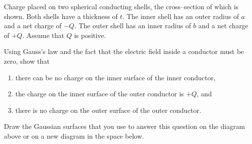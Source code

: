 \documentclass{article}
\begin{document}
Charge placed on two spherical conducting shells, the cross--section of which is shown. Both shells have a thickness of $t$. The inner shell has an outer radius of $a$ and a net charge of $-Q$. The outer shell has an inner radius of $b$ and a net charge of $+Q$. Assume that $Q$ is positive.



Using Gauss's law and the fact that the electric field inside a conductor must be zero, show that

\begin{enumerate}

  \item there can be no charge on the inner surface of the inner conductor,

  \item the charge on the inner surface of the outer conductor is $+Q$, and

  \item there is no charge on the outer surface of the outer conductor.

\end{enumerate}

Draw the Gaussian surfaces that you use to answer this question on the diagram above or on a new diagram in the space below.

\ifsolutions\else
\newpage
\fi


\end{document}
